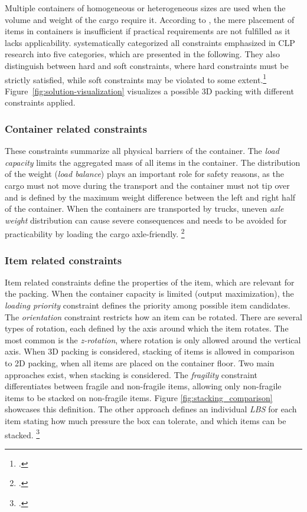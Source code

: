 Multiple containers of homogeneous or heterogeneous sizes are used when the volume and weight
of the cargo require it.
According to \textcite{bischoff_issues_1995}, the mere placement of items in containers is insufficient
if practical requirements are not fulfilled as it lacks applicability.
\textcite{bortfeldt_constraints_2013} systematically categorized all constraints emphasized in \gls{CLP} research
into five categories, which are presented in the following. They also distinguish between hard and soft constraints,
where hard constraints must be strictly satisfied, while soft constraints may be violated
to some extent.\footcites(cf.)()[p. 1f]{bortfeldt_constraints_2013}[p. 1f]{bischoff_issues_1995}
Figure~\ref{fig:solution-visualization} visualizes a possible 3D packing with different constraints applied.

\subsubsection{Container related constraints}
These constraints summarize all physical barriers of the container. The \textit{load capacity} limits the aggregated
mass of all items in the container. The distribution of the weight (\textit{load balance})
plays an important role for safety reasons, as the cargo must not move during the transport and the container
must not tip over and is defined by the maximum weight difference between the left and right half of the container.
When the containers are transported by trucks, uneven \textit{axle weight} distribution can cause severe
consequences and needs to be avoided for practicability by loading the cargo axle-friendly. \footcite[cf.][p. 849f]{krebs_advanced_2021}

\subsubsection{Item related constraints}
Item related constraints define the properties of the item, which are relevant
for the packing. When the container capacity is limited (output maximization),
the \textit{loading priority} constraint defines the priority among possible
item candidates. The \textit{orientation} constraint restricts how an item can be rotated.
There are several types of rotation, each defined by the axis around which the item rotates.
The most common is the \textit{z-rotation}, where rotation is only allowed around the vertical axis.
When 3D packing is considered, stacking of items is allowed in comparison to 2D packing, when all
items are placed on the container floor. Two main approaches exist, when stacking is considered.
The \textit{fragility} constraint differentiates between fragile and non-fragile items,
allowing only non-fragile items to be stacked on non-fragile items. Figure \ref{fig:stacking_comparison} showcases
this definition. The other approach defines an individual \textit{\gls{LBS}} for each
item stating how much pressure the box can tolerate, and which items can be stacked. \footcite[cf.][p. 847f]{krebs_advanced_2021}

